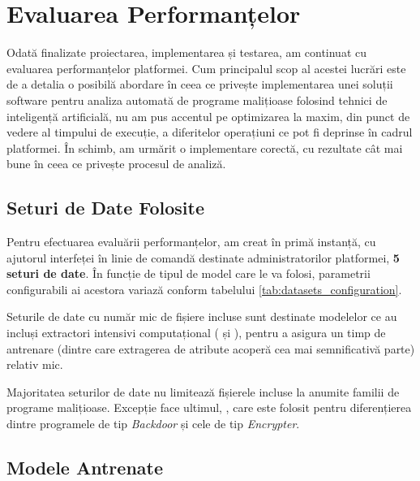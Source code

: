 \documentclass[../../main.tex]{subfiles}
\begin{document}
\chapter{Evaluarea Performanțelor}
\label{ch:evaluation}

Odată finalizate proiectarea, implementarea și testarea, am continuat cu eva\-luarea performanțelor platformei. Cum principalul scop al acestei lucrări este de a detalia o posibilă abordare în ceea ce privește implementarea unei soluții software pentru analiza automată de programe malițioase folosind tehnici de inteligență artificială, nu am pus accentul pe optimizarea la maxim, din punct de vedere al timpului de execuție, a diferitelor operațiuni ce pot fi deprinse în cadrul platformei. În schimb, am urmărit o implementare corectă, cu rezultate cât mai bune în ceea ce privește procesul de analiză.

\section{Seturi de Date Folosite}
\label{sec:evaluation_datasets}

Pentru efectuarea evaluării performanțelor, am creat în primă instanță, cu ajutorul interfeței în linie de comandă destinate administratorilor platformei, \textbf{5 seturi de date}. În funcție de tipul de model care le va folosi, parametrii configurabili ai acestora variază conform tabelului \ref{tab:datasets_configuration}.

Seturile de date cu număr mic de fișiere incluse sunt destinate modelelor ce au incluși extractori intensivi computațional ( și ), pentru a asigura un timp de antrenare (dintre care extragerea de atribute acoperă cea mai semnificativă parte) relativ mic.

Majoritatea seturilor de date nu limitează fișierele incluse la anumite familii de programe malițioase. Excepție face ultimul, , care este folosit pentru diferențierea dintre programele de tip \textit{Backdoor} și cele de tip \textit{Encrypter}.

\begin{landscape}
    \vspace*{\fill}
    
    \vspace*{\fill}
\end{landscape}

\section{Modele Antrenate}
\label{sec:evaluation_models}
\end{document}

